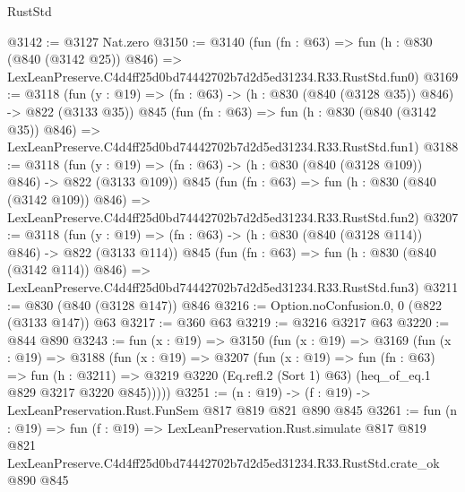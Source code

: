 \begin{lexlean}{RustStd}
\begin{coremodule}
@3142 := @3127 Nat.zero
@3150 := @3140
    (fun (fn : @63) =>
    fun (h : @830 (@840 (@3142 @25)) @846) =>
    LexLeanPreserve.C4d4ff25d0bd74442702b7d2d5ed31234.R33.RustStd.fun0)
@3169 := @3118
    (fun (y : @19) => (fn : @63) -> (h : @830 (@840 (@3128 @35)) @846) -> @822 (@3133 @35))
    @845
    (fun (fn : @63) =>
    fun (h : @830 (@840 (@3142 @35)) @846) =>
    LexLeanPreserve.C4d4ff25d0bd74442702b7d2d5ed31234.R33.RustStd.fun1)
@3188 := @3118
    (fun (y : @19) => (fn : @63) -> (h : @830 (@840 (@3128 @109)) @846) -> @822 (@3133 @109))
    @845
    (fun (fn : @63) =>
    fun (h : @830 (@840 (@3142 @109)) @846) =>
    LexLeanPreserve.C4d4ff25d0bd74442702b7d2d5ed31234.R33.RustStd.fun2)
@3207 := @3118
    (fun (y : @19) => (fn : @63) -> (h : @830 (@840 (@3128 @114)) @846) -> @822 (@3133 @114))
    @845
    (fun (fn : @63) =>
    fun (h : @830 (@840 (@3142 @114)) @846) =>
    LexLeanPreserve.C4d4ff25d0bd74442702b7d2d5ed31234.R33.RustStd.fun3)
@3211 := @830 (@840 (@3128 @147)) @846
@3216 := Option.noConfusion.{0, 0} (@822 (@3133 @147)) @63
@3217 := @360 @63
@3219 := @3216 @3217 @63
@3220 := @844 @890
@3243 := fun (x : @19) =>
  @3150
    (fun (x : @19) =>
    @3169
      (fun (x : @19) =>
      @3188
        (fun (x : @19) =>
        @3207
          (fun (x : @19) =>
          fun (fn : @63) =>
          fun (h : @3211) =>
          @3219 @3220 (Eq.refl.{2} (Sort 1) @63) (heq_of_eq.{1} @829 @3217 @3220 @845)))))
@3251 := (n : @19) -> (f : @19) -> LexLeanPreservation.Rust.FunSem @817 @819 @821 @890 @845
@3261 := fun (n : @19) =>
  fun (f : @19) =>
  LexLeanPreservation.Rust.simulate
    @817
    @819
    @821
    LexLeanPreserve.C4d4ff25d0bd74442702b7d2d5ed31234.R33.RustStd.crate_ok
    @890
    @845
\end{coremodule}
\end{lexlean}
